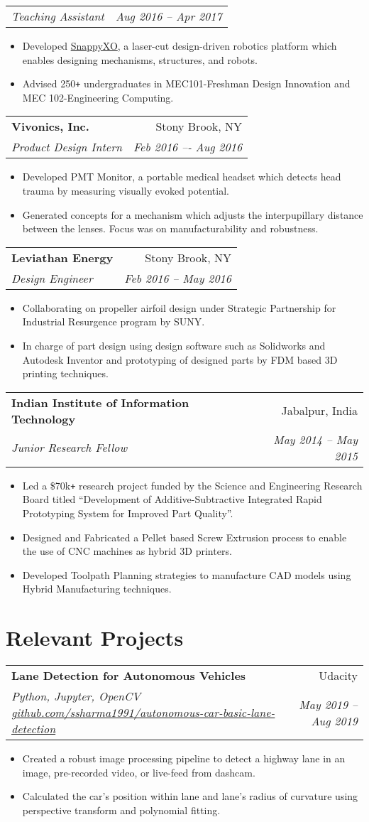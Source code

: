 \documentclass[letterpaper,10pt]{article}
\makeatletter
\newcommand{\resumeHeading}[4]{
  \vspace{-1pt}
    \begin{tabular*}{0.97\textwidth}{l@{\extracolsep{\fill}}r}
      \textbf{#1} & #2 \vspace{-2pt}\\ \vspace{1pt}
      \textit{\small#3} & \textit{\small #4} \\
    \end{tabular*}
}
\newcommand{\resumeSubheadingWithDate}[2]{
    \begin{tabular*}{0.97\textwidth}{l@{\extracolsep{\fill}}r}
      \textit{\small#1} & \textit{\small #2}\\
    \end{tabular*}
    \vspace{+2pt}
}
\newcommand{\resumeSection}[1]{
\vspace{-12pt}
\section{\textbf{#1}}
}
\newcommand{\resumeItemListStart}{
\vspace{-7pt}
\begin{itemize}[leftmargin=14pt]
}
\newcommand{\resumeItemListEnd}{
\vspace{+7pt}
\end{itemize}
}
\newcommand{\resumeItem}[1]{
  \item\small{
      {#1 \vspace{-7pt}
      }
  }
}
\makeatother
\begin{document}
      \vspace{-5pt}
      \resumeSubheadingWithDate{Teaching Assistant}{Aug 2016 -- Apr 2017}
      \resumeItemListStart
      	\resumeItem{Developed \href{http://snappyxo.com/}{SnappyXO}, a laser-cut design-driven robotics platform which enables designing mechanisms, structures, and robots.}
      	\resumeItem{Advised 250\texttt{+} undergraduates in MEC101-Freshman Design Innovation and MEC 102-Engineering Computing.}
      \resumeItemListEnd
      
      \resumeHeading
      {Vivonics, Inc.}{Stony Brook, NY}
      {Product Design Intern}{Feb 2016 –- Aug 2016}
      \resumeItemListStart
      \resumeItem{Developed PMT Monitor, a portable medical headset which detects head trauma by measuring visually evoked potential.}
      \resumeItem{Generated concepts for a mechanism which adjusts the interpupillary distance between the lenses. Focus was on manufacturability and robustness.}
      \resumeItemListEnd
      
      \resumeHeading
      {Leviathan Energy}{Stony Brook, NY}
      {Design Engineer}{Feb 2016 – May 2016}
      \resumeItemListStart
      \resumeItem{Collaborating on propeller airfoil design under Strategic Partnership for Industrial Resurgence program by SUNY.}
      \resumeItem{In charge of part design using design software such as Solidworks and Autodesk Inventor and prototyping of designed parts by FDM based 3D printing techniques. }
      \resumeItemListEnd
      
      \resumeHeading
      {Indian Institute of Information Technology}{Jabalpur, India}
      {Junior Research Fellow}{May 2014 -- May 2015}
      \resumeItemListStart
      	\resumeItem{Led a \$70k\texttt{+} research project funded by the Science and Engineering Research Board titled “Development of Additive-Subtractive Integrated Rapid Prototyping System for Improved Part Quality”.}
      	\resumeItem{Designed and Fabricated a Pellet based Screw Extrusion process to enable the use of CNC machines as hybrid 3D printers.}
      	\resumeItem{Developed Toolpath Planning strategies to manufacture CAD models using Hybrid Manufacturing techniques.}
      \resumeItemListEnd



\resumeSection{Relevant Projects}
	
	\resumeHeading{Lane Detection for Autonomous Vehicles}{Udacity}{Python, Jupyter, OpenCV \href{https://github.com/ssharma1991/autonomous-car-basic-lane-detection}{github.com/ssharma1991/autonomous-car-basic-lane-detection}}{May 2019 -- Aug 2019}
	\resumeItemListStart
	\resumeItem{Created a robust image processing pipeline to detect a highway lane in an image, pre-recorded video, or live-feed from dashcam.}
	\resumeItem{Calculated the car's position within lane and lane's radius of curvature using perspective transform and polynomial fitting.}
	\resumeItemListEnd
	
\end{document}
